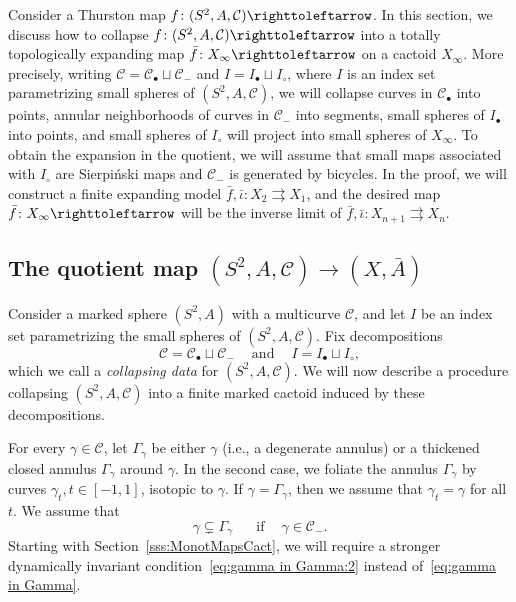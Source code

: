 \documentclass{amsart}
\theoremstyle{plain}
\theoremstyle{definition}
\theoremstyle{remark}
\newcommand{\reminder}[1]{\textsl{$\lhd\rhd$#1$\lhd\rhd$}\marginpar{$\lhd\rhd\lhd\rhd\lhd\rhd$}}%
\newcommand{\hide}[1]{}
\renewcommand{\sp}{{\ \ }}
\newcommand{\CC}{{\mathcal C}}
\newcommand\selfmap{\righttoleftarrow}
\begin{document}
Consider a Thurston map $f\colon (S^2,A,\CC)\selfmap$.  %
In this section, we discuss how to collapse $f\colon (S^2,A,\CC)\selfmap$ into a totally topologically expanding map $\bar f\colon X_\infty\selfmap$ on a cactoid $X_\infty$. More precisely, writing $\CC=\CC_\bullet \sqcup \CC_-$ and $I=I_\bullet \sqcup I_\circ$, where $I$ is an index set parametrizing small spheres of $(S^2,A,\CC)$, we will collapse curves in $\CC_\bullet$ into points,  annular neighborhoods of curves in $\CC_-$ into segments, small spheres of $I_\bullet$ into points, and small spheres of $I_\circ$ will project into small spheres of $X_\infty$. To obtain the expansion in the quotient, we will assume that small maps associated with $I_\circ$ are Sierpi\'{n}ski maps and $\CC_-$ is generated by bicycles. In the proof, we will construct a finite expanding model  $\bar f, \bar \iota \colon X_2 \rightrightarrows X_1$, and the desired map $\bar f\colon X_\infty\selfmap$ will be the inverse limit of $\bar f, \bar \iota \colon X_{n+1} \rightrightarrows X_n$.




\subsection{The quotient map $ (S^2,A,\CC)\to (X,\bar A)$} %
Consider a marked sphere $(S^2,A)$ with a multicurve $\CC$, and let $I$ be an index set parametrizing the small spheres of $(S^2,A,\CC)$. Fix decompositions  
\begin{equation}
\label{eq:coll data}
\CC=\CC_\bullet\sqcup \CC_-\sp\sp\text{ and }\sp\sp I=I_\bullet\sqcup I_\circ,
\end{equation}
which we call a \emph{collapsing data} for $(S^2,A,\CC)$. We will now describe a procedure collapsing $(S^2, A, \CC)$ into a finite marked cactoid induced by these decompositions. 



For every $\gamma\in \CC$, let $\Gamma_\gamma$ be either $\gamma$ (i.e., a degenerate annulus) or a thickened closed annulus $\Gamma_\gamma$ around $\gamma$. In the second case, we foliate the annulus $\Gamma_\gamma$ by curves $\gamma_{t}, t\in [-1,1]$, isotopic to $\gamma$. If $\gamma=\Gamma_\gamma$, then we assume that $\gamma_t=\gamma$ for all $t$. We assume that
\begin{equation}
   \label{eq:gamma in Gamma}  \gamma\subsetneq \Gamma_\gamma\sp\sp\sp\text{ if }\sp \sp \gamma\in \CC_-. 
\end{equation}
Starting with Section~\ref{sss:MonotMapsCact}, we will require a stronger dynamically invariant condition~\eqref{eq:gamma in Gamma:2} instead of~\eqref{eq:gamma in Gamma}. %
\end{document}

